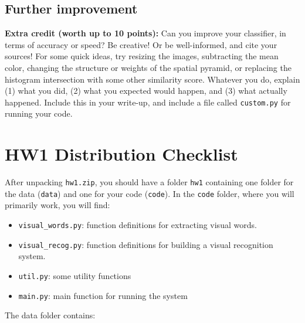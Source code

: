 \documentclass[10pt]{article}
\begin{document}
\subsection{Further improvement}

{\bf Extra credit (worth up to 10 points):} Can you improve your classifier, in terms of accuracy or speed? Be creative! Or be well-informed, and cite your sources! For some quick ideas, try resizing the images, subtracting the mean color, changing the structure or weights of the spatial pyramid, or replacing the histogram intersection with some other similarity score. Whatever you do, explain (1) what you did, (2) what you expected would happen, and (3) what actually happened. Include this in your write-up, and include a file called {\tt custom.py} for running your code.


\section{HW1 Distribution Checklist}
\label{sec:Manifest}
After unpacking {\tt hw1.zip}, you should have a folder {\tt hw1} containing
one folder for the data ({\tt data}) and one for your code ({\tt code}).
In the {\tt code} folder, where you will primarily work, you will find:
\begin{itemize}
\item {\tt visual\_words.py}: function definitions for extracting visual words.
\item {\tt visual\_recog.py}: function definitions for building a visual recognition system.
\item {\tt util.py}: some utility functions
\item {\tt main.py}: main function for running the system

\end{itemize}

The data folder contains:
\end{document}
